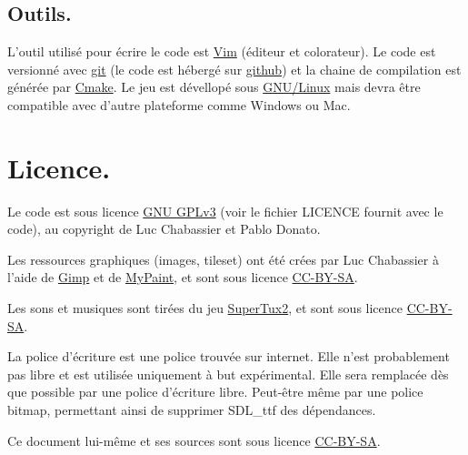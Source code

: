 \documentclass{article}
\begin{document}
\subsection{Outils.}
L'outil utilisé pour écrire le code est \href{http://www.vim.org/}{Vim} (éditeur et colorateur). Le code est versionné avec \href{http://git-scm.com/}{git} (le code est hébergé sur \href{https://github.com/Lycee/ISN\_snake}{github}) et la chaine de compilation est générée par \href{http://www.cmake.org/}{Cmake}. Le jeu est dévellopé sous \href{https://en.wikipedia.org/wiki/Linux}{GNU/Linux} mais devra être compatible avec d'autre plateforme comme Windows ou Mac.

\section{Licence.}
Le code est sous licence \href{http://gplv3.fsf.org/}{GNU GPLv3} (voir le fichier LICENCE fournit avec le code), au copyright de Luc Chabassier et Pablo Donato.

Les ressources graphiques (images, tileset) ont été crées par Luc Chabassier à l'aide de \href{http://www.gimp.org/}{Gimp} et de \href{http://mypaint.intilinux.com/}{MyPaint}, et sont sous licence \href{https://creativecommons.org/licenses/by-sa/2.0/}{CC-BY-SA}.

Les sons et musiques sont tirées du jeu \href{http://supertux.lethargik.org/}{SuperTux2}, et sont sous licence \href{https://creativecommons.org/licenses/by-sa/2.0/}{CC-BY-SA}.

La police d'écriture est une police trouvée sur internet. Elle n'est probablement pas libre et est utilisée uniquement à but expérimental. Elle sera remplacée dès que possible par une police d'écriture libre. Peut-être même par une police bitmap, permettant ainsi de supprimer SDL\_ttf des dépendances.

Ce document lui-même et ses sources sont sous licence \href{https://creativecommons.org/licenses/by-sa/2.0/}{CC-BY-SA}.
\end{document}
